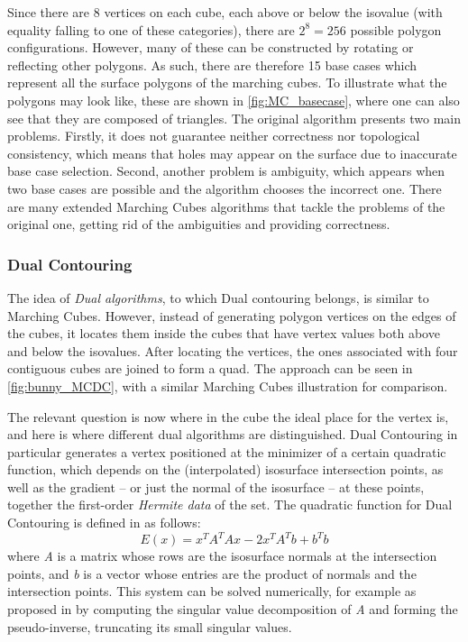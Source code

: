 Since there are 8 vertices on each cube, each above or below the isovalue (with equality falling to one of these categories), there are $2^8=256$ possible polygon configurations. However, many of these can be constructed by rotating or reflecting other polygons. As such, there are therefore 15 base cases which represent all the surface polygons of the marching cubes. To illustrate what the polygons may look like, these are shown in \autoref{fig:MC_basecase}, where one can also see that they are composed of triangles. 
The original algorithm presents two main problems. Firstly, it does not guarantee neither
correctness nor topological consistency, which means that holes may appear on the surface due
to inaccurate base case selection. Second, another problem is ambiguity, which appears when two
base cases are possible and the algorithm chooses the incorrect one. There are many extended Marching Cubes
algorithms that tackle the problems of the original one, getting rid of the ambiguities and
providing correctness. \cite{ExtendedMC}

\subsubsection{Dual Contouring}
The idea of \emph{Dual algorithms}, to which Dual contouring belongs, is similar to Marching Cubes. However, instead of generating polygon vertices on the
edges of the cubes, it locates them inside the cubes that have vertex values both above and below the isovalues.
After locating the vertices, the ones associated with four contiguous cubes are joined to form a quad. The approach can be seen in \autoref{fig:bunny_MCDC}, with a similar Marching Cubes illustration for comparison. 

The relevant question is now where in the cube the ideal place for the vertex is, and here is where different dual algorithms are distinguished. Dual Contouring in particular generates a vertex positioned at the minimizer of a
certain quadratic function, which depends on the (interpolated) isosurface intersection points, as well as the gradient -- or just the normal of the isosurface -- at these points, together the first-order \emph{Hermite data} of the set.
The quadratic function for Dual Contouring is defined in \cite{Hermite2002} as follows:
\begin{equation*}
E(x)= x^TA^TAx-2x^TA^Tb+b^Tb
\end{equation*}
where \textit{A} is a matrix whose rows are the isosurface normals at the intersection points, and \textit{b} is a vector whose entries are the product of normals and the intersection points. This system can be solved numerically, for example as proposed in \cite{Hermite2002} by computing the
singular value decomposition of \textit{A} and forming the pseudo-inverse, truncating its small singular values. 


